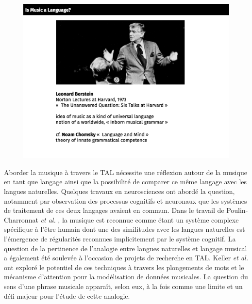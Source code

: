 \begin{figure}[!h]
	\centering
	\includegraphics[height=85mm, width=120mm]{
    z_images/1_contexte/0_Bernstein.png}
\end{figure}


Aborder la musique à travers le TAL nécessite une réflexion autour de la
musique en tant que langage ainsi que la possibilité de comparer ce même
langage avec les langues naturelles. Quelques travaux en neurosciences ont
abordé la question, notamment par observation des processus cognitifs et
neuronaux que les systèmes de traitement de ces deux langages avaient en
commun. Dans le travail de Poulin-Charronnat \textit{et al.}
\cite{poulincharronnat:hal-01985213}, la musique est reconnue comme étant un
système complexe spécifique à l’être humain dont une des similitudes avec les
langues naturelles est l’émergence de régularités reconnues implicitement par
le système cognitif. La question de la pertinence de l’analogie entre langues
naturelles et langage musical a également été soulevée à l’occasion de projets
de recherche en TAL. Keller \textit{et al.} \cite{keller:hal-03279850} ont
exploré le potentiel de ces techniques à travers les plongements de mots et le
mécanisme d’attention pour la modélisation de données musicales. La question du
sens d’une phrase musicale apparaît, selon eux, à la fois comme une limite et
un défi majeur pour l’étude de cette analogie.

